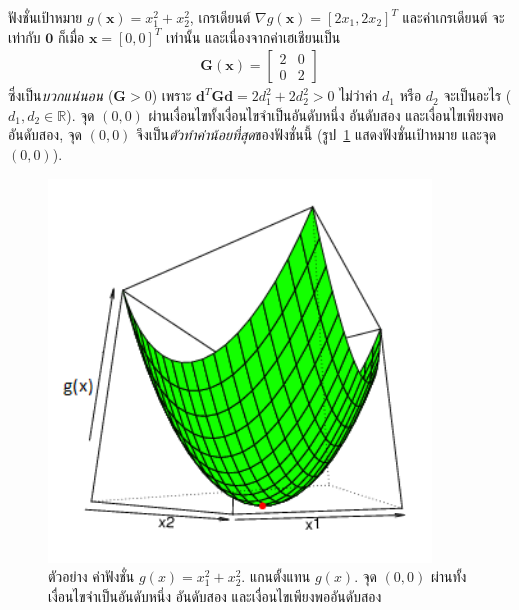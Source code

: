 \begin{myexample}
ฟังชั่นเป้าหมาย $g(\mathbf{x}) = x_1^2 + x_2^2$, เกรเดียนต์ $\nabla g(\mathbf{x}) = [2 x_1, 2 x_2]^T$ 
และค่าเกรเดียนต์ จะเท่ากับ $\mathbf{0}$ ก็เมื่อ $\mathbf{x} = [0,0]^T$ เท่านั้น 
และเนื่องจากค่าเฮเชียนเป็น
\begin{eqnarray}
   \mathbf{G}(\mathbf{x}) = \begin{bmatrix}
      2 & 0 \\
      0 & 2
   \end{bmatrix}
\nonumber   
\end{eqnarray}
ซึ่งเป็น\textit{บวกแน่นอน} ($\mathbf{G} > 0$) เพราะ 
$\mathbf{d}^T \mathbf{G} \mathbf{d} = 2 d_1^2 + 2 d_2^2 > 0$ ไม่ว่าค่า $d_1$ หรือ $d_2$ จะเป็นอะไร ($d_1, d_2 \in \mathbb{R}$).
จุด $(0,0)$ ผ่านเงื่อนไขทั้งเงื่อนไขจำเป็นอันดับหนึ่ง อันดับสอง และเงื่อนไขเพียงพออันดับสอง, จุด $(0,0)$ จึงเป็น\textit{ตัวทำค่าน้อยที่สุด}ของฟังชั่นนี้ (รูป~\ref{fig: SOSC example} แสดงฟังชั่นเป้าหมาย และจุด $(0,0)$).
\end{myexample}

%
\begin{figure}
\begin{center}
\includegraphics[width=4.0in]
{02Background/SOSC.png}
\end{center}
\caption{ตัวอย่าง ค่าฟังชั่น $g(x) = x_1^2 + x_2^2$.
แกนตั้งแทน $g(x)$.
จุด $(0,0)$ ผ่านทั้งเงื่อนไขจำเป็นอันดับหนึ่ง อันดับสอง และเงื่อนไขเพียงพออันดับสอง}
\label{fig: SOSC example}
\end{figure}
%

